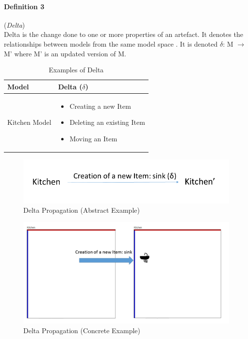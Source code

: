 \paragraph{Definition 3} (\textit{Delta})\\ 
Delta is the change done to one or more properties of an artefact. It denotes the relationships between models from the same model space \cite{benchmarx-reload}. It is denoted $\delta$: M $\longrightarrow$ M' where M' is an updated version of M.

\begin{table}
	\centering	
	\begin{tabular}{|p{5cm}|p{10cm}|}
		\hline
		\rowcolor[gray]{.8}	
		\textbf{Model} & \textbf{Delta ($\delta$)} \\
		\hline
		Kitchen Model & 
		\begin{itemize}
			\item Creating a new Item
			\item Deleting an existing Item
			\item Moving an Item
		\end{itemize}\\
		\hline				
		
	\end{tabular}
	\label{tab:Examples_of_Delta}
	\caption{Examples of Delta}
\end{table}

\begin{figure}
	\includegraphics[width=1\textwidth]{figures/Delta_Abstract}
	\caption{Delta Propagation (Abstract Example)}
	\label{fig:DeltaPropagation_Abstract}
\end{figure}
\begin{figure}
	\includegraphics[width=1\textwidth]{figures/Delta_Concrete}
	\caption{Delta Propagation (Concrete Example)}
	\label{fig:DeltaPropagation_Concrete}
\end{figure}

